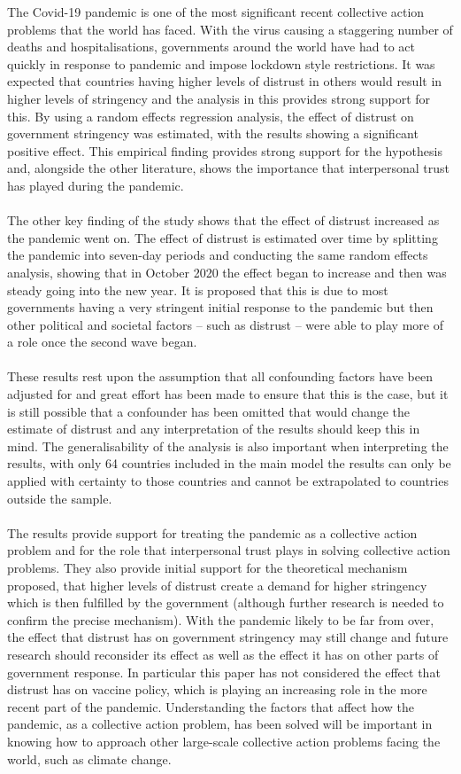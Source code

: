 \documentclass[
  11pt,
]{article}
\begin{document}
The Covid-19 pandemic is one of the most significant recent collective action problems that the world has faced. With the virus causing a staggering number of deaths and hospitalisations, governments around the world have had to act quickly in response to pandemic and impose lockdown style restrictions. It was expected that countries having higher levels of distrust in others would result in higher levels of stringency and the analysis in this provides strong support for this. By using a random effects regression analysis, the effect of distrust on government stringency was estimated, with the results showing a significant positive effect. This empirical finding provides strong support for the hypothesis and, alongside the other literature, shows the importance that interpersonal trust has played during the pandemic.\\
~\\
The other key finding of the study shows that the effect of distrust increased as the pandemic went on. The effect of distrust is estimated over time by splitting the pandemic into seven-day periods and conducting the same random effects analysis, showing that in October 2020 the effect began to increase and then was steady going into the new year. It is proposed that this is due to most governments having a very stringent initial response to the pandemic but then other political and societal factors -- such as distrust -- were able to play more of a role once the second wave began.\\
~\\
These results rest upon the assumption that all confounding factors have been adjusted for and great effort has been made to ensure that this is the case, but it is still possible that a confounder has been omitted that would change the estimate of distrust and any interpretation of the results should keep this in mind. The generalisability of the analysis is also important when interpreting the results, with only 64 countries included in the main model the results can only be applied with certainty to those countries and cannot be extrapolated to countries outside the sample.\\
~\\
The results provide support for treating the pandemic as a collective action problem and for the role that interpersonal trust plays in solving collective action problems. They also provide initial support for the theoretical mechanism proposed, that higher levels of distrust create a demand for higher stringency which is then fulfilled by the government (although further research is needed to confirm the precise mechanism). With the pandemic likely to be far from over, the effect that distrust has on government stringency may still change and future research should reconsider its effect as well as the effect it has on other parts of government response. In particular this paper has not considered the effect that distrust has on vaccine policy, which is playing an increasing role in the more recent part of the pandemic. Understanding the factors that affect how the pandemic, as a collective action problem, has been solved will be important in knowing how to approach other large-scale collective action problems facing the world, such as climate change.\\
\end{document}
